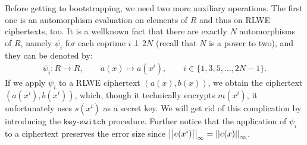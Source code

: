 \documentclass[letterpaper,10pt,english]{jupyterBook}
\begin{document}
\begin{DUlineblock}{0em}
\item[] 
\end{DUlineblock}

\sphinxAtStartPar
Before getting to bootstrapping, we need two more auxiliary operations.
The first one is an automorphism evaluation on elements of \(R\) and thus on RLWE ciphertexts, too.
It is a well\sphinxhyphen{}known fact that there are exactly \(N\) automorphisms of \(R\), namely \(\psi_i\) for each coprime \(i \perp 2N\) (recall that \(N\) is a power to two), and they can be denoted by:
\begin{equation*}
\begin{split}\psi_i : R \longrightarrow R,  \qquad a(x) \longmapsto a(x^i), \qquad i \in \{1,3,5,\dots,2N-1\}.\end{split}
\end{equation*}
\sphinxAtStartPar
If we apply \(\psi_i\) to a RLWE ciphertext \((a(x), b(x))\), we obtain the ciphertext \((a(x^i), b(x^i))\), which, though it technically encrypts \(m(x^i)\), it unfortunately uses \(s(x^i)\) as a secret key.
We will get rid of this complication by introducing the \(\texttt{key-switch}\) procedure.
Further notice that the application of \(\psi_i\) to a ciphertext preserves the error size since \(\left\lvert\left\lvert e(x^i) \right\rvert\right\rvert_\infty = \left\lvert\left\lvert e(x) \right\rvert\right\rvert_\infty\).

\begin{DUlineblock}{0em}
\item[] 
\end{DUlineblock}
\end{document}
